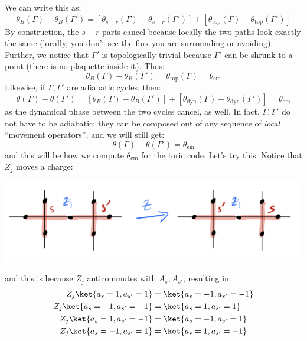 We can write this as:
\begin{equation}
    \theta_B(\Gamma) - \theta_B(\Gamma') = [\theta_{s-r}(\Gamma) - \theta_{s-r}(\Gamma')] + [\theta_{\text{top}}(\Gamma) - \theta_{\text{top}}(\Gamma')]
\end{equation}
By construction, the $s-r$ parts cancel because locally the two paths look exactly the same (locally, you don't see the flux you are surrounding or avoiding). Further, we notice that $\Gamma'$ is topologically trivial because $\Gamma'$ can be shrunk to a point (there is no plaquette inside it). Thus:
\begin{equation}
    \theta_B(\Gamma) - \theta_B(\Gamma') = \theta_{\text{top}}(\Gamma) = \theta_{\text{em}}
\end{equation}
Likewise, if $\Gamma, \Gamma'$ are adiabatic cycles, then:
\begin{equation}
    \theta(\Gamma) - \theta(\Gamma') = [\theta_B(\Gamma) - \theta_B(\Gamma')] + [\theta_{\text{dyn}}(\Gamma) - \theta_{\text{dyn}}(\Gamma')] = \theta_{\text{em}}
\end{equation}
as the dynamical phase between the two cycles cancel, as well. In fact, $\Gamma, \Gamma'$ do not have to be adiabatic; they can be composed out of any sequence of \emph{local} ``movement operators'', and we will still get:
\begin{equation}
    \theta(\Gamma) - \theta(\Gamma') = \theta_{\text{em}}
\end{equation}
and this will be how we compute $\theta_{\text{em}}$ for the toric code. Let's try this. Notice that $Z_j$ moves a charge:
\begin{center}
    \includegraphics[scale=0.35]{Lectures/Images/lec5-movecharges.png}
\end{center}

and this is because $Z_j$ anticommutes with $A_s, A_{s'}$, resulting in:
\begin{equation}\label{eq:applyZ}
    \begin{split}
        Z_j\ket{a_s = 1, a_{s'} = 1} &= \ket{a_s = -1, a_{s'} = -1}
        \\ Z_j\ket{a_s = -1, a_{s'} = -1} &= \ket{a_s = 1, a_{s'} = 1}
        \\ Z_j\ket{a_s = 1, a_{s'} = -1} &= \ket{a_s = -1, a_{s'} = 1}
        \\ Z_j\ket{a_s = -1, a_{s'} = 1} &= \ket{a_s = 1, a_{s'} = -1}
    \end{split}
\end{equation}